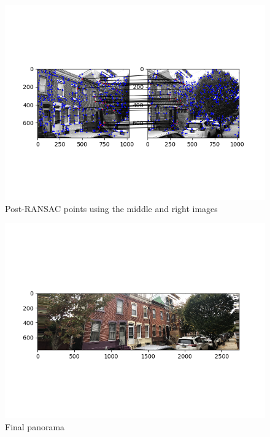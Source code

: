 \documentclass[10pt]{article}
\begin{document}
		\begin{figure}[h]
			\caption{Post-RANSAC points using the middle and right images}
			\centering
			\includegraphics{img/bricksRANSACm2r.png}
		\end{figure}
		

		\begin{figure}[h]
			\caption{Final panorama}
			\centering
			\includegraphics{img/bricksResult.png}
		\end{figure}
\end{document}
